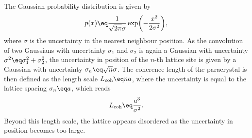 \documentclass[\main/dresen_thesis.tex]{subfiles}
\begin{document}
    The Gaussian probability distribution is given by
    \begin{align}
      p(x) \eq \frac{1}{\sqrt{2 \pi} \sigma} \exp \biggl( - \frac{x^2}{2 \sigma^2}\biggr),
    \end{align}
    where $\sigma$ is the uncertainty in the nearest neighbour position.
    As the convolution of two Gaussians with uncertainty $\sigma_1$ and $\sigma_2$ is again a Gaussian with uncertainty $\sigma^2 \eq \sigma_1^2 + \sigma_2^2$, the uncertainty in position of the $n$-th lattice site is given by a Gaussian with uncertainty $\sigma_n \eq \sqrt{n} \sigma$.
    The coherence length of the paracrystal is then defined as the length scale $L_\mathrm{coh} \eq n a$, where the uncertainty is equal to the lattice spacing $\sigma_n \eq a$, which reads
    \begin{align}
      L_\mathrm{coh} \eq \frac{a^3}{\sigma^2}.\label{eq:appendix:calculations:paracrystal:CoherenceLength}
    \end{align}
    Beyond this length scale, the lattice appears disordered as the uncertainty in position becomes too large.
\end{document}
